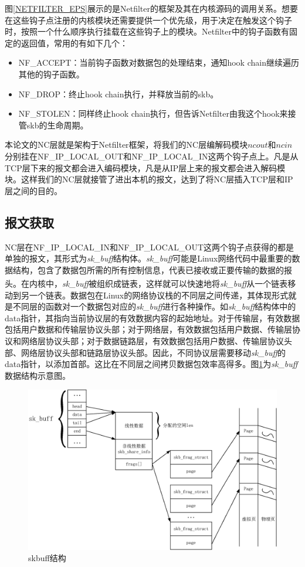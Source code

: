 \par
图\ref{NETFILTER_EPS}展示的是Netfilter的框架及其在内核源码的调用关系。想要在这些钩子点注册的内核模块还需要提供一个优先级，用于决定在触发这个钩子时，按照一个什么顺序执行挂载在这些钩子上的模块。Netfilter中的钩子函数有固定的返回值，常用的有如下几个：
\begin{itemize}[leftmargin=.5in]
	\item NF\_ACCEPT：当前钩子函数对数据包的处理结束，通知hook chain继续遍历其他的钩子函数。
	\item NF\_DROP：终止hook chain执行，并释放当前的skb。
	\item NF\_STOLEN：同样终止hook chain执行，但告诉Netfilter由我这个hook来接管skb的生命周期。
\end{itemize}
本论文的NC层就是架构于Netfilter框架，将我们的NC层编解码模块$ncout$和$ncin$分别挂在NF\_IP\_LOCAL\_OUT和NF\_IP\_LOCAL\_IN这两个钩子点上。凡是从TCP层下来的报文都会进入编码模块，凡是从IP层上来的报文都会进入解码模块。这样我们的NC层就接管了进出本机的报文，达到了将NC层插入TCP层和IP层之间的目的。
\subsection{报文获取}
NC层在NF\_IP\_LOCAL\_IN和NF\_IP\_LOCAL\_OUT这两个钩子点获得的都是单独的报文，其形式为\emph{sk\_buff}结构体。\emph{sk\_buff}可能是Linux网络代码中最重要的数据结构，包含了数据包所需的所有控制信息，代表已接收或正要传输的数据的报头\textsuperscript{\cite{linux网络技术内幕}}。在内核中，\emph{sk\_buff}被组织成链表，这样就可以快速地将\emph{sk\_buff}从一个链表移动到另一个链表。数据包在Linux的网络协议栈的不同层之间传递，其体现形式就是不同层的函数对一个数据包对应的\emph{sk\_buff}进行各种操作。如\emph{sk\_buff}结构体中的data指针，其指向当前协议层的有效数据内容的起始地址。对于传输层，有效数据包括用户数据和传输层协议头部；对于网络层，有效数据包括用户数据、传输层协议和网络层协议头部；对于数据链路层，有效数据包括用户数据、传输层协议头部、网络层协议头部和链路层协议头部。因此，不同协议层需要移动\emph{sk\_buff}的data指针，以添加首部。这比在不同层之间拷贝数据包效率高得多。图\ref{SKBUFFEPS}为\emph{sk\_buff}数据结构示意图。
\begin{figure}[htbp]
	\centering
	\includegraphics[width=6in]{figures/skbuff.eps}
	\caption{skbuff结构}
	\label{SKBUFFEPS}
\end{figure}

